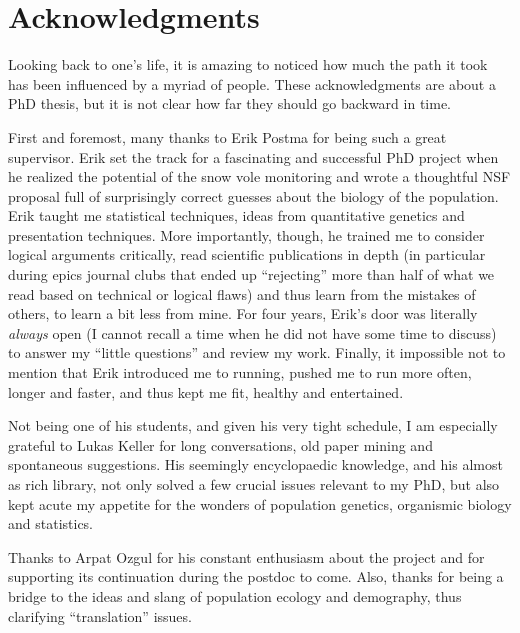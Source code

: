 
\chapter{Acknowledgments}


Looking back to one's life, it is amazing to noticed how much the path it took has been influenced by a myriad of people. These acknowledgments are about a PhD thesis, but it is not clear how far they should go backward in time.

First and foremost, many thanks to Erik Postma for being such a great supervisor. Erik set the track for a fascinating and successful PhD project when he realized the potential of the snow vole monitoring and wrote a thoughtful NSF proposal full of surprisingly correct guesses about the biology of the population. Erik taught me statistical techniques, ideas from quantitative genetics and presentation techniques. More importantly, though, he trained me to consider logical arguments critically, read scientific publications in depth (in particular during epics journal clubs that ended up ``rejecting'' more than half of what we read based on technical or logical flaws) and thus learn from the mistakes of others, to learn a bit less from mine. For four years, Erik's door was literally \emph{always} open (I cannot recall a time when he did not have some time to discuss) to answer my ``little questions'' and review my work.
Finally, it impossible not to mention that Erik introduced me to running, pushed me to run more often, longer and faster, and thus kept me fit, healthy and entertained.

Not being one of his students, and given his very tight schedule, I am especially grateful to Lukas Keller for long conversations, old paper mining and spontaneous suggestions. His seemingly encyclopaedic knowledge, and his almost as rich library, not only solved a few crucial issues relevant to my PhD, but also kept acute my appetite for the wonders of population genetics, organismic biology and statistics. 

Thanks to Arpat Ozgul for his constant enthusiasm about the project and for supporting its continuation during the postdoc to come. Also, thanks for being a bridge to the ideas and slang of population ecology and demography, thus clarifying ``translation'' issues. 

